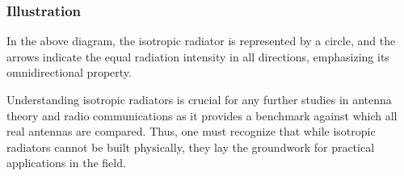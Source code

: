 \subsubsection{Illustration}

\begin{center}
\end{center}

In the above diagram, the isotropic radiator is represented by a circle, and the arrows indicate the equal radiation intensity in all directions, emphasizing its omnidirectional property.

Understanding isotropic radiators is crucial for any further studies in antenna theory and radio communications as it provides a benchmark against which all real antennas are compared. Thus, one must recognize that while isotropic radiators cannot be built physically, they lay the groundwork for practical applications in the field.
